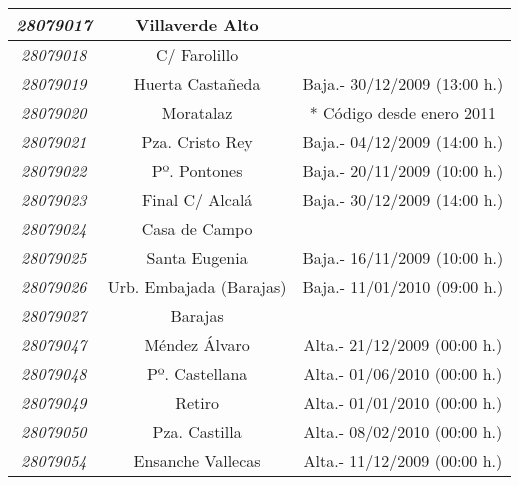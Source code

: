 \begin{table}[H]
\begin{center}
\begin{tabular}{|c|c|c|}
		\textit{28079017}        & Villaverde Alto      &                              \\ \hline
		\textit{28079018}        & C/ Farolillo         &                              \\ \hline
		\textit{28079019}        & Huerta Castañeda     & Baja.- 30/12/2009 (13:00 h.) \\ \hline
		\textit{28079020}        & Moratalaz            & * Código desde enero 2011    \\ \hline
		\textit{28079021}        & Pza. Cristo Rey      & Baja.- 04/12/2009 (14:00 h.) \\ \hline
		\textit{28079022}        & Pº. Pontones         & Baja.- 20/11/2009 (10:00 h.) \\ \hline
		\textit{28079023}        & Final C/ Alcalá      & Baja.- 30/12/2009 (14:00 h.) \\ 	\hline
		\textit{28079024} & Casa de Campo           &                                                                                                  \\ \hline
		\textit{28079025} & Santa Eugenia           & Baja.- 16/11/2009 (10:00 h.)                                                                     \\ \hline
		\textit{28079026} & Urb. Embajada (Barajas) & Baja.- 11/01/2010 (09:00 h.)                                                                     \\ \hline
		\textit{28079027} & Barajas                 &                                                                                                  \\ \hline
		\textit{28079047} & Méndez Álvaro           & Alta.- 21/12/2009 (00:00 h.)                                                                     \\ \hline
		\textit{28079048} & Pº. Castellana          & Alta.- 01/06/2010 (00:00 h.)                                                                     \\ \hline
		\textit{28079049} & Retiro                  & Alta.- 01/01/2010 (00:00 h.)                                                                     \\ \hline
		\textit{28079050} & Pza. Castilla           & Alta.- 08/02/2010 (00:00 h.)                                                                     \\ \hline
		\textit{28079054} & Ensanche Vallecas       & Alta.- 11/12/2009 (00:00 h.)                                                                     \\ \hline

\end{tabular}
\end{center}
\end{table}
